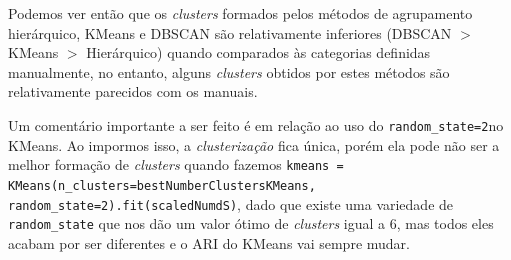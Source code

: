Podemos ver então que os \textit{clusters} formados pelos métodos de agrupamento hierárquico, KMeans e DBSCAN são relativamente inferiores (DBSCAN $>$ KMeans $>$ Hierárquico) quando comparados às categorias definidas manualmente, no entanto, alguns \textit{clusters} obtidos por estes métodos são relativamente parecidos com os manuais.

Um comentário importante a ser feito é em relação ao uso do \verb|random_state=2|no KMeans. Ao impormos isso, a \textit{clusterização} fica única, porém ela pode não ser a melhor formação de \textit{clusters} quando fazemos \verb|kmeans = KMeans(n_clusters=bestNumberClustersKMeans, random_state=2).fit(scaledNumdS)|, dado que existe uma variedade de \verb|random_state| que nos dão um valor ótimo de \textit{clusters} igual a 6, mas todos eles acabam por ser diferentes e o ARI do KMeans vai sempre mudar.